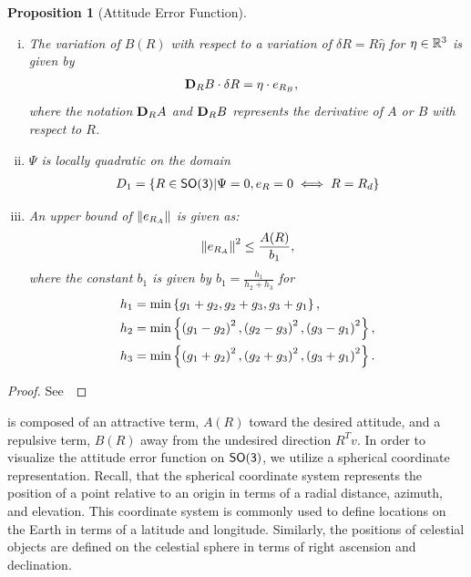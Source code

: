 \documentclass[10pt,fleqn]{IJCAS}  %
\newtheorem{prop}{Proposition}
\begin{document}
\begin{multicols}{2}
\begin{prop}[Attitude Error Function]
\begin{enumerate}[(i)]
	\begin{align}
		\dirDiff{A}{R} &= \eta \cdot e_{R_A} .
	\end{align}
	\item \label{item:prop_erb} The variation of \( B(R) \) with respect to a variation of \( \delta R = R \hat{\eta} \) for \( \eta \in \mathbb{R}^3 \) is given by
	\begin{align}
		\mathbf{D}_{R} B \cdot \delta R &= \eta \cdot e_{R_{B}} ,
	\end{align}
  where the notation \( \mathbf{D}_R A \) and \(\mathbf{D}_R B\) represents the derivative of \( A \) or \( B \) with respect to \( R\).
    \item \label{item:prop_psi_quadratic} \( \Psi \) is locally quadratic on the domain 
    \begin{align}\label{eq:psi_quadratic_domain}
        D_1 = \left\{ R \in \mathsf{SO(3)} \vert \Psi = 0, e_{R} = 0 \iff R = R_d  \right\} 
    \end{align}
	\item \label{item:prop_era_upbound}An upper bound of \( \left\| e_{R_A} \right\| \) is given as:
	\begin{align}
		\left\| e_{R_A} \right\|^2 \leq \frac{A(R)}{b_1} , \label{eqn:psi_lower_bound}
	\end{align}
	where the constant \( b_1 \) is given by \( b_1 = \frac{h_1}{h_2 + h_3} \) for 
	\begin{align*}
		h_1 &= \min\left\{ g_1 + g_2, g_2 + g_3 , g_3 + g_1 \right\} ,\\
		h_2 &= \min\left\{ \left( g_1 -g_2 \right)^2,\left( g_2 -g_3 \right)^2 , \left( g_3 -g_1 \right)^2 \right\} ,\\
		h_3 &= \min\left\{ \left( g_1 + g_2 \right)^2, \left( g_2 + g_3 \right)^2 , \left( g_3 + g_1 \right)^2 \right\}.		
	\end{align*}
\end{enumerate}
\end{prop}
\begin{proof}
See~
\end{proof}

 is composed of an attractive term, \( A (R) \) toward the desired attitude, and a repulsive term, \( B(R) \) away from the undesired direction \( R^T v \).
In order to visualize the attitude error function on \( \mathsf{SO(3)} \), we utilize a spherical coordinate representation.
Recall, that the spherical coordinate system represents the position of a point relative to an origin in terms of a radial distance, azimuth, and elevation.
This coordinate system is commonly used to define locations on the Earth in terms of a latitude and longitude.
Similarly, the positions of celestial objects are defined on the celestial sphere in terms of right ascension and declination. 
\end{multicols}
\end{document}
